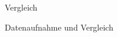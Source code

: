 
\begin{frame}[c]{Vergleich}

  \begin{center}
    Datenaufnahme und Vergleich
  \end{center}

\end{frame}
